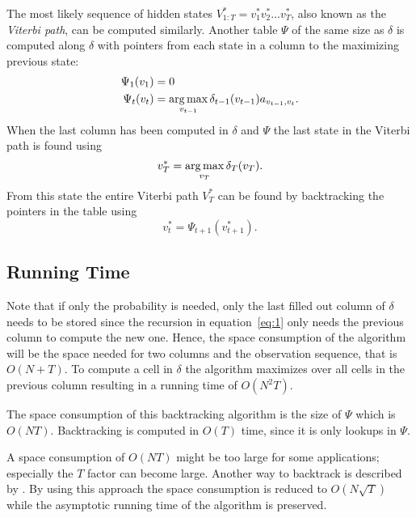 The most likely sequence of hidden states $V_{1:T}^* = v_1^*v_2^*\dots{}v_T^*$,
also known as the \emph{Viterbi path}, can be computed similarly. Another table
$\Psi$ of the same size as $\delta$ is computed along $\delta$ with pointers
from each state in a column to the maximizing previous state:
\begin{equation*}
  \begin{aligned}
    \Psi_1(v_1) &= 0 \\
    \Psi_t(v_t) &= \operatorname*{arg\,max}_{v_{t - 1}} \delta_{t - 1}(v_{t - 1}) a_{v_{t - 1}, v_t}.
  \end{aligned}
\end{equation*}
When the last column has been computed in $\delta$ and $\Psi$ the last state
in the Viterbi path is found using
\begin{equation*}
  v_T^* = \operatorname*{arg\,max}_{v_T} \delta_T(v_T).
\end{equation*}
From this state the entire Viterbi path $V_T^*$ can be found by backtracking
the pointers in the table using
\begin{equation*}
  v_t^* = \Psi_{t + 1}(v_{t + 1}^*).
\end{equation*}

\subsection{Running Time}

Note that if only the probability is needed, only the last filled out column of
$\delta$ needs to be stored since the recursion in equation~\eqref{eq:1} only
needs the previous column to compute the new one. Hence, the space consumption
of the algorithm will be the space needed for two columns and the observation
sequence, that is $O(N + T)$. To compute a cell in $\delta$ the algorithm
maximizes over all cells in the previous column resulting in a running time of
$O(N^2 T)$.

The space consumption of this backtracking algorithm is the size of $\Psi$
which is $O(N T)$. Backtracking is computed in $O(T)$ time, since it is only
lookups in $\Psi$.

A space consumption of $O(N T)$ might be too large for some applications;
especially the $T$ factor can become large. Another way to backtrack is
described by \citet{Tarnas01061998}. By using this approach the space
consumption is reduced to $O(N \sqrt{T})$ while the asymptotic running
time of the algorithm is preserved.


